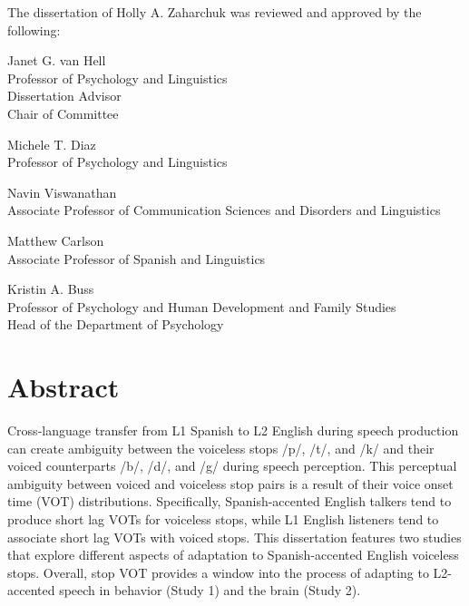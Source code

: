\documentclass[
  12pt,
  twoside]{article}
\begin{document}
\begin{flushleft}
\begin{singlespacing}

The dissertation of Holly A. Zaharchuk was reviewed and approved by the following:\\

\vspace{12pt}

Janet G. van Hell\\
Professor of Psychology and Linguistics\\
Dissertation Advisor\\
Chair of Committee\\

\vspace{12pt}

Michele T. Diaz\\
Professor of Psychology and Linguistics\\

\vspace{12pt}

Navin Viswanathan\\
Associate Professor of Communication Sciences and Disorders and Linguistics\\

\vspace{12pt}

Matthew Carlson\\
Associate Professor of Spanish and Linguistics\\

\vspace{12pt}

Kristin A. Buss\\
Professor of Psychology and Human Development and Family Studies\\
Head of the Department of Psychology\\

\end{singlespacing}
\end{flushleft}

\newpage
\section*{Abstract}

Cross-language transfer from L1 Spanish to L2 English during speech production can create ambiguity between the voiceless stops /p/, /t/, and /k/ and their voiced counterparts /b/, /d/, and /g/ during speech perception.
This perceptual ambiguity between voiced and voiceless stop pairs is a result of their voice onset time (VOT) distributions.
Specifically, Spanish-accented English talkers tend to produce short lag VOTs for voiceless stops, while L1 English listeners tend to associate short lag VOTs with voiced stops.
This dissertation features two studies that explore different aspects of adaptation to Spanish-accented English voiceless stops.
Overall, stop VOT provides a window into the process of adapting to L2-accented speech in behavior (Study 1) and the brain (Study 2).
\end{document}
